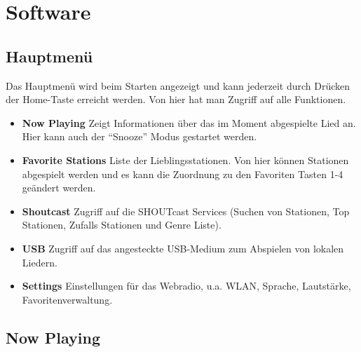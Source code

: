 \documentclass[12pt,a4paper,openany]{memoir}
\begin{document}
\chapter{Software}

\section{Hauptmenü}
\fboxsep=1mm%
\fboxrule=8pt%

Das Hauptmenü wird beim Starten angezeigt und kann jederzeit durch Drücken der Home-Taste erreicht werden. Von hier hat man Zugriff auf alle Funktionen.


\begin{itemize}
 \item \textbf{Now Playing} Zeigt Informationen über das im Moment abgespielte Lied an. Hier kann auch der ``Snooze'' Modus gestartet werden. 
 \item \textbf{Favorite Stations} Liste der Lieblingsstationen. Von hier können Stationen abgespielt werden und es kann die Zuordnung zu den Favoriten Tasten 1-4 geändert werden. 
 \item \textbf{Shoutcast} Zugriff auf die SHOUTcast Services (Suchen von Stationen, Top Stationen, Zufalls Stationen und Genre Liste).
 \item \textbf{USB} Zugriff auf das angesteckte USB-Medium zum Abspielen von lokalen Liedern. 
 \item \textbf{Settings} Einstellungen für das Webradio, u.a. WLAN, Sprache, Lautstärke, Favoritenverwaltung.
\end{itemize}

\section{Now Playing}
\end{document}
